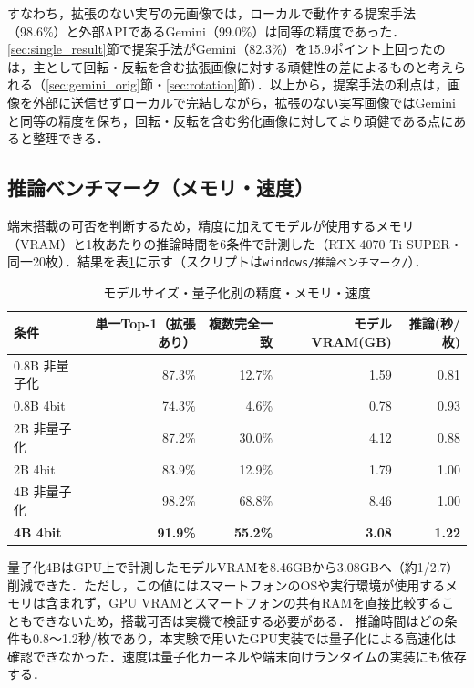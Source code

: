 \documentclass[dvipdfmx]{jsarticle}
\begin{document}
すなわち，拡張のない実写の元画像では，ローカルで動作する提案手法（98.6\%）と外部APIであるGemini（99.0\%）は同等の精度であった．\ref{sec:single_result}節で提案手法がGemini（82.3\%）を15.9ポイント上回ったのは，主として回転・反転を含む拡張画像に対する頑健性の差によるものと考えられる（\ref{sec:gemini_orig}節・\ref{sec:rotation}節）．以上から，提案手法の利点は，画像を外部に送信せずローカルで完結しながら，拡張のない実写画像ではGeminiと同等の精度を保ち，回転・反転を含む劣化画像に対してより頑健である点にあると整理できる．

\subsection{推論ベンチマーク（メモリ・速度）}\label{sec:bench}

端末搭載の可否を判断するため，精度に加えてモデルが使用するメモリ（VRAM）と1枚あたりの推論時間を6条件で計測した（RTX 4070 Ti SUPER・同一20枚）．結果を表\ref{tab:bench}に示す（スクリプトは\texttt{windows/推論ベンチマーク/}）．

\begin{table}[htbp]
\centering
\caption{モデルサイズ・量子化別の精度・メモリ・速度}
\label{tab:bench}
\small
\begin{tabular}{lrrrr}
\hline
条件 & 単一Top-1（拡張あり） & 複数完全一致 & モデルVRAM(GB) & 推論(秒/枚) \\
\hline
0.8B 非量子化 & 87.3\% & 12.7\% & 1.59 & 0.81 \\
0.8B 4bit & 74.3\% & 4.6\% & 0.78 & 0.93 \\
2B 非量子化 & 87.2\% & 30.0\% & 4.12 & 0.88 \\
2B 4bit & 83.9\% & 12.9\% & 1.79 & 1.00 \\
4B 非量子化 & 98.2\% & 68.8\% & 8.46 & 1.00 \\
\textbf{4B 4bit} & \textbf{91.9\%} & \textbf{55.2\%} & \textbf{3.08} & \textbf{1.22} \\
\hline
\end{tabular}
\end{table}

量子化4BはGPU上で計測したモデルVRAMを8.46GBから3.08GBへ（約1/2.7）削減できた．ただし，この値にはスマートフォンのOSや実行環境が使用するメモリは含まれず，GPU VRAMとスマートフォンの共有RAMを直接比較することもできないため，搭載可否は実機で検証する必要がある．
推論時間はどの条件も0.8〜1.2秒/枚であり，本実験で用いたGPU実装では量子化による高速化は確認できなかった．速度は量子化カーネルや端末向けランタイムの実装にも依存する．
\end{document}
